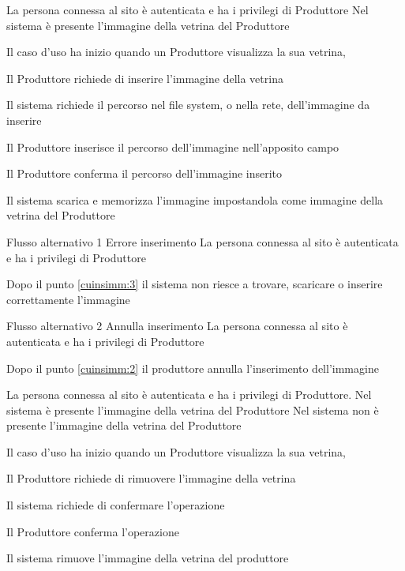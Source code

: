 {}
{La persona connessa al sito è autenticata e ha i privilegi di Produttore}
{Nel sistema è presente l'immagine della vetrina del Produttore}
{\begin{enumCU}
		\item Il caso d'uso ha inizio quando un Produttore visualizza la sua vetrina, 
		\item Il Produttore richiede di inserire l'immagine della vetrina
		\item Il sistema richiede il percorso nel file system, o nella rete, dell'immagine da inserire 
		\item Il Produttore inserisce il percorso dell'immagine nell'apposito campo\label{cuinsimm:2}
		\item Il Produttore conferma il percorso dell'immagine inserito\label{cuinsimm:3}
		\item Il sistema scarica e memorizza l'immagine impostandola come immagine della vetrina del Produttore
	\end{enumCU}}
%
{Flusso alternativo 1}%
{Errore inserimento}%
{La persona connessa al sito è autenticata e ha i privilegi di Produttore}%
{\postNulle}%
{\begin{enumCU}
		\item Dopo il punto \ref{cuinsimm:3} il sistema non riesce a trovare, scaricare o inserire correttamente l'immagine
	\end{enumCU}}%
%
{Flusso alternativo 2}%
{Annulla inserimento}%
{La persona connessa al sito è autenticata e ha i privilegi di Produttore}%
{\postNulle}%
{\begin{enumCU}
		\item Dopo il punto \ref{cuinsimm:2} il produttore annulla l'inserimento dell'immagine
	\end{enumCU}}%

\tabcuvspace

{}
{La persona connessa al sito è autenticata e ha i privilegi di Produttore. Nel sistema è presente l'immagine della vetrina del Produttore}
{Nel sistema non è presente l'immagine della vetrina del Produttore}
{\begin{enumCU}
		\item Il caso d'uso ha inizio quando un Produttore visualizza la sua vetrina, 
		\item Il  Produttore richiede di rimuovere l'immagine della vetrina
		\item Il sistema richiede di confermare l'operazione \label{cudelimm:2}
		\item Il Produttore conferma l'operazione
		\item Il sistema rimuove l'immagine della vetrina del produttore
	\end{enumCU}}

